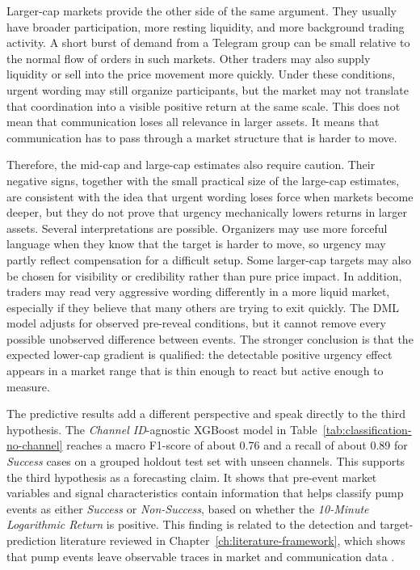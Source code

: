 Larger-cap markets provide the other side of the same argument. They usually have broader participation, more resting liquidity, and more background trading activity. A short burst of demand from a Telegram group can be small relative to the normal flow of orders in such markets. Other traders may also supply liquidity or sell into the price movement more quickly. Under these conditions, urgent wording may still organize participants, but the market may not translate that coordination into a visible positive return at the same scale. This does not mean that communication loses all relevance in larger assets. It means that communication has to pass through a market structure that is harder to move.

Therefore, the mid-cap and large-cap estimates also require caution. Their negative signs, together with the small practical size of the large-cap estimates, are consistent with the idea that urgent wording loses force when markets become deeper, but they do not prove that urgency mechanically lowers returns in larger assets. Several interpretations are possible. Organizers may use more forceful language when they know that the target is harder to move, so urgency may partly reflect compensation for a difficult setup. Some larger-cap targets may also be chosen for visibility or credibility rather than pure price impact. In addition, traders may read very aggressive wording differently in a more liquid market, especially if they believe that many others are trying to exit quickly. The DML model adjusts for observed pre-reveal conditions, but it cannot remove every possible unobserved difference between events. The stronger conclusion is that the expected lower-cap gradient is qualified: the detectable positive urgency effect appears in a market range that is thin enough to react but active enough to measure.

The predictive results add a different perspective and speak directly to the third hypothesis. The \textit{Channel ID}-agnostic XGBoost model in Table~\ref{tab:classification-no-channel} reaches a macro F1-score of about 0.76 and a recall of about 0.89 for \textit{Success} cases on a grouped holdout test set with unseen channels. This supports the third hypothesis as a forecasting claim. It shows that pre-event market variables and signal characteristics contain information that helps classify pump events as either \textit{Success} or \textit{Non-Success}, based on whether the \textit{10-Minute Logarithmic Return} is positive. This finding is related to the detection and target-prediction literature reviewed in Chapter~\ref{ch:literature-framework}, which shows that pump events leave observable traces in market and communication data \cite{kamps2018pump, victor2019cryptocurrency, lamorgia2020pump, hu2023sequence}.

